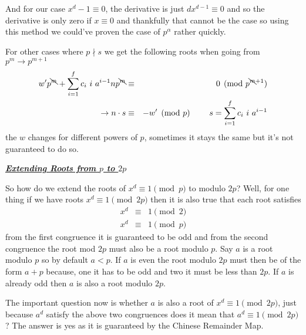 \documentclass[aps,preprint,preprintnumbers,nofootinbib,showpacs,prd]{revtex4-1}
\newcommand{\nbea}{\begin{eqnarray*}}
\newcommand{\neea}{\end{eqnarray*}}
\begin{document}
And for our case $x^d - 1 \equiv 0$, the derivative is just $d x^{d-1} \equiv 0$ and so the derivative is only zero if $x \equiv 0$ and thankfully that cannot be the case so using this method we could've proven the case of $p^\alpha$ rather quickly.

For other cases where $p\nmid s$ we get the following roots when going from $p^m \to p^{m+1}$
%
\nbea
w'p^{\bcancel{m}} + \sum_{i = 1}^f c_i~ i~ a^{i-1}np^{\bcancel{m}} & \equiv & 0 \pmod{p^{\bcancel{m}+1}} \\
\to n \cdot s & \equiv & -w' \pmod{p} ~~~~~~~ s = \sum_{i = 1}^f c_i~ i~ a^{i-1}
\neea
%
the $w$ changes for different powers of $p$, sometimes it stays the same but it's not guaranteed to do so.

\bigskip
\underline{\textit{\textbf{Extending Roots from $p$ to $2p$}}}
\bigskip

So how do we extend the roots of $x^d \equiv 1 \pmod{p}$ to modulo $2p$? Well, for one thing if we have roots $x^d \equiv 1 \pmod{2p}$ then it is also true that each root satisfies
%
\nbea
x^d & \equiv & 1 \pmod{2} \\
x^d & \equiv & 1 \pmod{p}
\neea
%
from the first congruence it is guaranteed to be odd and from the second congruence the root mod $2p$ must also be a root modulo $p$. Say $a$ is a root modulo $p$ so by default $a < p$. If $a$ is even the root modulo $2p$ must then be of the form $a + p$ because, one it has to be odd and two it must be less than $2p$. If $a$ is already odd then $a$ is also a root modulo $2p$. 

The important question now is whether $a$ is also a root of $x^d \equiv 1 \pmod{2p}$, just because $a^d$ satisfy the above two congruences does it mean that $a^d \equiv 1 \pmod{2p}$? The answer is yes as it is guaranteed by the Chinese Remainder Map.
\end{document}
